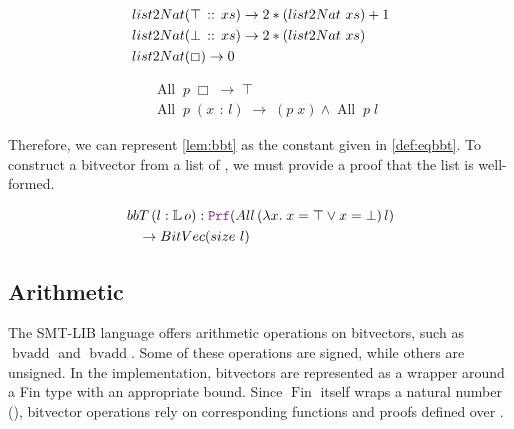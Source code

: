 \begin{definition}
\begin{align*}
&\mathop{list2Nat}(\top \,::\, xs) \rightarrow 2 * (\mathop{list2Nat}\,xs) + 1 \\
&\mathop{list2Nat}(\bot \,::\, xs) \rightarrow 2 * (\mathop{list2Nat}\,xs) \\
&\mathop{list2Nat}(\Box) \rightarrow 0
\end{align*}

\begin{align*}
&\mathop{All}\;p\;\Box \;\rightarrow\; \top \\
&\mathop{All}\;p\;(x \,\::\, l) \;\rightarrow\; (p\;x) \land \mathop{All}\;p\;l
\end{align*}
\end{definition}

Therefore, we can represent \cref{lem:bbt} as the constant given in \cref{def:eqbbt}.
To construct a bitvector from a list of , we must provide a proof that the list is well-formed.

\begin{definition}
\begin{align*}
&\mathop{bbT}\,(l : \bb{L}\,o) : \prf (\mathop{All}\,(\lambda x.\; x = \top \lor x = \bot)\,l)\\
&\quad \ra \mathop{BitVec}(\mathop{size}\,l)
\end{align*}
\label{def:eqbbt}
\end{definition}


\subsection{Arithmetic}

The SMT-LIB language offers arithmetic operations on bitvectors, such as $\mathop{bvadd}$ and $\mathop{bvadd}$. 
Some of these operations are signed, while others are unsigned. In the implementation, bitvectors are represented as a wrapper around a Fin type with an appropriate bound.
Since $\mathop{Fin}$ itself wraps a natural number (\N), bitvector operations rely on corresponding functions and proofs defined over \N.

